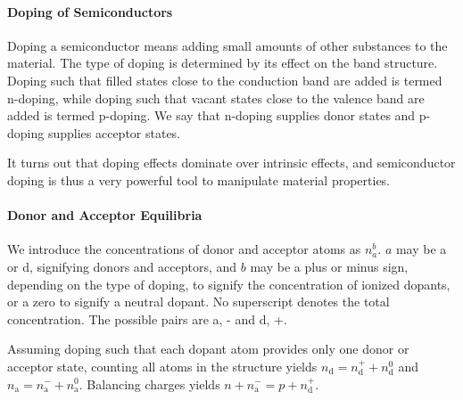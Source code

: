 \paragraph{Doping of Semiconductors}
Doping a semiconductor means adding small amounts of other substances to the material. The type of doping is determined by its effect on the band structure. Doping such that filled states close to the conduction band are added is termed n-doping, while doping such that vacant states close to the valence band are added is termed p-doping. We say that n-doping supplies donor states and p-doping supplies acceptor states.

It turns out that doping effects dominate over intrinsic effects, and semiconductor doping is thus a very powerful tool to manipulate material properties.

\paragraph{Donor and Acceptor Equilibria}
We introduce the concentrations of donor and acceptor atoms as $n_{a}^{b}$. $a$ may be a or d, signifying donors and acceptors, and $b$ may be a plus or minus sign, depending on the type of doping, to signify the concentration of ionized dopants, or a zero to signify a neutral dopant. No superscript denotes the total concentration. The possible pairs are a, - and d, +.

Assuming doping such that each dopant atom provides only one donor or acceptor state, counting all atoms in the structure yields $n_{\text{d}} = n_{\text{d}}^{+} + n_{\text{d}}^{0}$ and $n_{\text{a}} = n_{\text{a}}^{-} + n_{\text{a}}^{0}$. Balancing charges yields $n + n_{\text{a}}^{-} = p + n_{\text{d}}^{+}$.

